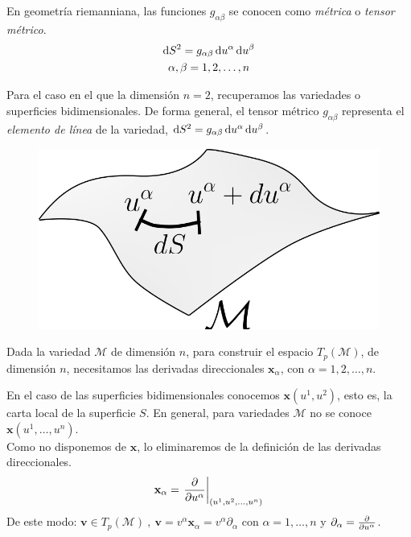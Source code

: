 En geometría riemanniana, las funciones $g_{\alpha \beta} $ se conocen como \emph{métrica} o \emph{tensor métrico}.
\begin{gather*}
    \odif{S^2}=g_{\alpha \beta} \odif{u^\alpha}\odif{u^\beta}\\
    \alpha ,\beta =1,2,\ldots, n
\end{gather*}

Para el caso en el que la dimensión $n=2$, recuperamos las variedades o superficies bidimensionales. De forma general, el tensor métrico $g_{\alpha \beta}$ representa el \emph{elemento de línea} de la variedad, $\odif{S^2}=g_{\alpha \beta} \odif{u^\alpha }\odif{u^\beta}$.

\begin{figure}
    \centering
    \includegraphics[scale=.3]{FOTOS/manifold.png}
\end{figure}

Dada la variedad $\mathcal{M}$ de dimensión $n$, para construir el espacio $T_p(\mathcal{M})$, de dimensión $n$, necesitamos las derivadas direccionales $\mathbf{x}_\alpha $, con $\alpha =1,2,\ldots ,n$. 

En el caso de las superficies bidimensionales conocemos $\mathbf{x}(u^1,u^2)$, esto es, la carta local de la superficie $S$. En general, para variedades $\mathcal{M}$ no se conoce $\mathbf{x}(u^1,\ldots , u^n)$.\\

Como no disponemos de $\mathbf{x}$, lo eliminaremos de la definición de las derivadas direccionales.
$$
\mathbf{x}_\alpha =\left .\pdv{}{u^\alpha }\right |_{(u^1,u^2,\ldots,u^n)}
$$
De este modo: $\mathbf{v}\in T_p(\mathcal{M}) \ , \ \mathbf{v}=v^\alpha \mathbf{x}_\alpha =v^\alpha \partial _\alpha $ con $\alpha =1,\ldots ,n$ y $\partial_\alpha =\pdv{}{u^\alpha }$.\\

